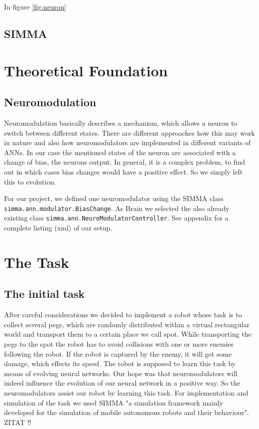 \documentclass[12pt,fleqn,a4paper]{article}
\begin{document}
In figure \ref{fig:neuron}

\subsection{SIMMA}

\section{Theoretical Foundation}
\subsection{Neuromodulation}
Neuromodulation basically describes a mechanism, which allows a neuron to switch between different states. There are different approaches how this may work in nature and also how neuromodulators are implemented in different variants of ANNs. In our case the mentioned states of the neuron are associated with a change of bias, the neurons output. In general, it is a complex problem, to find out in which cases bias changes would have a positive effect. So we simply left this to evolution.

For our project, we defined one neuromodulator using the SIMMA class\\ \texttt{simma.ann.modulator.BiasChange}. As Brain we selected the also already existing class \texttt{simma.ann.NeuroModulatorController}. See appendix for a complete listing (xml) of our setup.

\section{The Task}

\subsection{The initial task}
After careful considerations we decided to implement a robot whose task is to collect several pegs, which are randomly distributed within a virtual rectangular world and transport them to a certain place we call spot. While transporting the pegs to the spot the robot has to avoid collisions with one or more enemies following the robot. If the robot is captured by the enemy, it will get some damage, which effects its speed. The robot is supposed to learn this task by means of evolving neural networks. Our hope was that neuromodulators will indeed influence the evolution of our neural network in a positive way. So the neuromodulators assist our robot by learning this task. For implementation and simulation of the task we used SIMMA "a simulation framework mainly developed for the simulation of mobile autonomous robots and their behaviour". ZITAT !!
\end{document}

